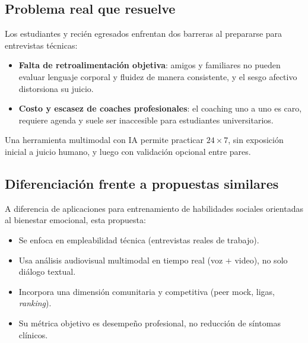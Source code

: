 \subsection{Problema real que resuelve}
Los estudiantes y recién egresados enfrentan dos barreras al prepararse para
entrevistas técnicas:

\begin{itemize}
  \item \textbf{Falta de retroalimentación objetiva}: amigos y familiares no
        pueden evaluar lenguaje corporal y fluidez de manera consistente, y
        el sesgo afectivo distorsiona su juicio.
  \item \textbf{Costo y escasez de coaches profesionales}: el coaching uno
        a uno es caro, requiere agenda y suele ser inaccesible para
        estudiantes universitarios.
\end{itemize}

\noindent Una herramienta multimodal con IA permite practicar
$24\times 7$, sin exposición inicial a juicio humano, y luego con
validación opcional entre pares.

\subsection{Diferenciación frente a propuestas similares}
A diferencia de aplicaciones para entrenamiento de habilidades sociales
orientadas al bienestar emocional, esta propuesta:

\begin{itemize}
  \item Se enfoca en empleabilidad técnica (entrevistas reales de trabajo).
  \item Usa análisis audiovisual multimodal en tiempo real (voz $+$ video),
        no solo diálogo textual.
  \item Incorpora una dimensión comunitaria y competitiva (peer mock,
        ligas, \textit{ranking}).
  \item Su métrica objetivo es desempeño profesional, no reducción de
        síntomas clínicos.
\end{itemize}
